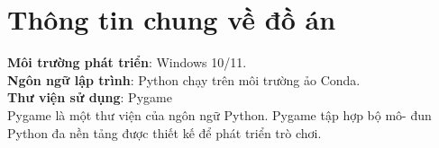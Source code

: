 \section{Thông tin chung về đồ án}
\textbf{Môi trường phát triển}: Windows 10/11.\\
\textbf{Ngôn ngữ lập trình}: Python chạy trên môi trường ảo Conda.\\
\textbf{Thư viện sử dụng}: Pygame\\
Pygame là một thư viện của ngôn ngữ Python. Pygame tập hợp bộ mô- đun Python đa nền tảng được thiết kế để phát triển trò chơi.
